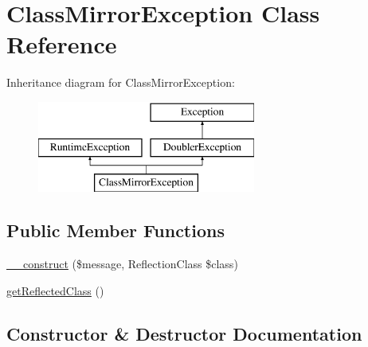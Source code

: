 \hypertarget{class_prophecy_1_1_exception_1_1_doubler_1_1_class_mirror_exception}{}\section{Class\+Mirror\+Exception Class Reference}
\label{class_prophecy_1_1_exception_1_1_doubler_1_1_class_mirror_exception}
Inheritance diagram for Class\+Mirror\+Exception\+:\begin{figure}[H]
\begin{center}
\leavevmode
\includegraphics[height=3.000000cm]{class_prophecy_1_1_exception_1_1_doubler_1_1_class_mirror_exception}
\end{center}
\end{figure}
\subsection*{Public Member Functions}
\begin{DoxyCompactItemize}
\item 
\mbox{\hyperlink{class_prophecy_1_1_exception_1_1_doubler_1_1_class_mirror_exception_abd6c4a53fdcef421cb58e134a56e4bae}{\+\_\+\+\_\+construct}} (\$message, Reflection\+Class \$class)
\item 
\mbox{\hyperlink{class_prophecy_1_1_exception_1_1_doubler_1_1_class_mirror_exception_a76c6b8e0d0587534918cb7faa5765437}{get\+Reflected\+Class}} ()
\end{DoxyCompactItemize}


\subsection{Constructor \& Destructor Documentation}
\mbox{\label{class_prophecy_1_1_exception_1_1_doubler_1_1_class_mirror_exception_abd6c4a53fdcef421cb58e134a56e4bae}} 
